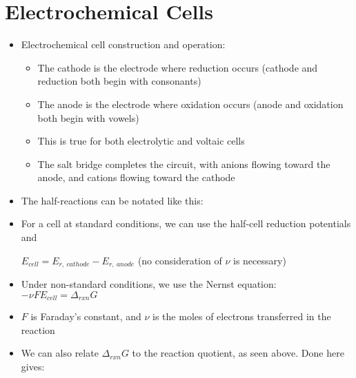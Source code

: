 \documentclass[12pt, openany, letterpaper]{memoir}
\begin{document}
\section{Electrochemical Cells}
\begin{itemize}
	\item Electrochemical cell construction and operation:
	      \begin{itemize}
		      \item The cathode is the electrode where reduction occurs (cathode and reduction both begin with consonants)
		      \item The anode is the electrode where oxidation occurs (anode and oxidation both begin with vowels)
		      \item This is true for both electrolytic and voltaic cells
		      \item The salt bridge completes the circuit, with anions flowing toward the anode, and cations flowing toward the cathode
	      \end{itemize}
	\item The half-reactions can be notated like this: 
	\item For a cell at standard conditions, we can use the half-cell reduction potentials and

	      $E_{cell}=E_{r,~cathode}-E_{r,~anode}$ (no consideration of $\nu$ is necessary)
	\item Under non-standard conditions, we use the Nernst equation: $-\nu FE_{cell}=\Delta_{rxn}G$
	\item $F$ is Faraday's constant, and $\nu$ is the moles of electrons transferred in the reaction
	\item We can also relate $\Delta_{rxn}G$ to the reaction quotient, as seen above. Done here gives:


\end{itemize}
\end{document}
